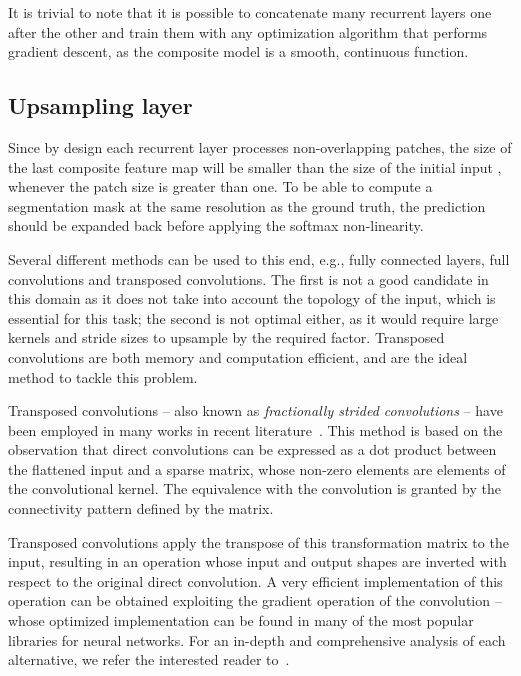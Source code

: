 \documentclass[times,art10,twocolumn,latex8]{article}
\begin{document}
It is trivial to note that it is possible to concatenate many recurrent layers
 one after the other and train them with any
optimization algorithm that performs gradient descent, as the composite model
is a smooth, continuous function.

\subsection{Upsampling layer}\label{sec:upsampling}
Since by design each recurrent layer processes non-overlapping patches, the
size of the last composite feature map will be smaller than the size of the
initial input , whenever the patch size is greater than one. To be
able to compute a segmentation mask at the same resolution as the ground truth,
the prediction should be expanded back before applying the softmax non-linearity.

Several different methods can be used to this end, e.g., fully connected
layers, full convolutions and transposed convolutions. The first is not a good
candidate in this domain as it does not take into account the topology of the
input, which is essential for this task; the second is not optimal either, as
it would require large kernels and stride sizes to upsample by the
required factor. Transposed convolutions are both memory and
computation efficient, and are the ideal method to tackle this problem.

Transposed convolutions -- also known as \emph{fractionally strided
convolutions} -- have been employed in many works in recent
literature~\cite{Zeiler-ICCV2011,ZeilerFergus14,long2015fully,
radford2015unsupervised,im2016generating}. This method is based on the observation
that direct convolutions can be expressed as a dot product between the
flattened input and a sparse matrix, whose non-zero elements are elements of the
convolutional kernel. The equivalence with the convolution is granted by the
connectivity pattern defined by the matrix.

Transposed convolutions apply the transpose of this transformation matrix to
the input, resulting in an operation whose input and output shapes are inverted
with respect to the original direct convolution. A very efficient implementation of
this operation can be obtained exploiting the gradient operation of the
convolution -- whose optimized implementation can be found in many of the most
popular libraries for neural networks. For an in-depth and comprehensive
analysis of each alternative, we refer the interested reader
to~\cite{dumoulin2016guide}.
\end{document}
